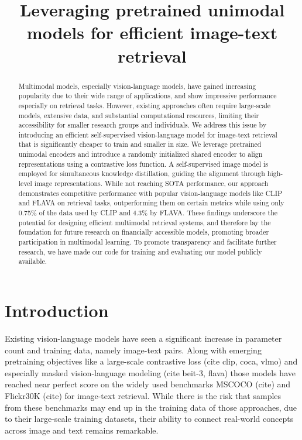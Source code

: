 \documentclass[10pt]{article} %
\title{Leveraging pretrained unimodal models for efficient image-text retrieval}
\begin{document}
\maketitle

\begin{abstract}
Multimodal models, especially vision-language models, have gained increasing popularity due to their wide range of applications, and show impressive performance especially on retrieval tasks. However, existing approaches often require large-scale models, extensive data, and substantial computational resources, limiting their accessibility for smaller research groups and individuals. We address this issue by introducing an efficient self-supervised vision-language model for image-text retrieval that is significantly cheaper to train and smaller in size. We leverage pretrained unimodal encoders and introduce a randomly initialized shared encoder to align representations using a contrastive loss function. A self-supervised image model is employed for simultaneous knowledge distillation, guiding the alignment through high-level image representations. While not reaching SOTA performance, our approach demonstrates competitive performance with popular vision-language models like CLIP and FLAVA on retrieval tasks, outperforming them on certain metrics while using only 0.75\% of the data used by CLIP and 4.3\% by FLAVA. These findings underscore the potential for designing efficient multimodal retrieval systems, and therefore lay the foundation for future research on financially accessible models, promoting broader participation in multimodal learning. To promote transparency and facilitate further research, we have made our code for training and evaluating our model publicly available.
\end{abstract}

\section{Introduction}
Existing vision-language models have seen a significant increase in parameter count and training data, namely image-text pairs. Along with emerging pretraining objectives like a large-scale contrastive loss (cite clip, coca, vlmo) and especially masked vision-language modeling (cite beit-3, flava) those models have reached near perfect score on the widely used benchmarks MSCOCO (cite) and Flickr30K (cite) for image-text retrieval. While there is the risk that samples from these benchmarks may end up in the training data of those approaches, due to their large-scale training datasets, their ability to connect real-world concepts across image and text remains remarkable.
\end{document}
